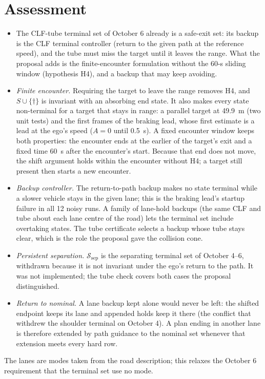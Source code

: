 \documentclass[11pt]{article}
\begin{document}
\section{Assessment}
\begin{itemize}
\item The CLF-tube terminal set of October 6 already is a safe-exit set: its
  backup is the CLF terminal controller (return to the given path at the
  reference speed), and the tube must miss the target until it leaves the
  range. What the proposal adds is the finite-encounter formulation without
  the 60-s sliding window (hypothesis H4), and a backup that may keep
  avoiding.
\item \emph{Finite encounter.} Requiring the target to leave the range
  removes H4, and $S\cup\{\dagger\}$ is invariant with an absorbing end state.
  It also makes every state non-terminal for a target that stays in range: a
  parallel target at 49.9~m (two unit tests) and the first frames of the
  braking lead, whose first estimate is a lead at the ego's speed ($A=0$ until
  0.5~s). A fixed encounter window keeps both properties: the encounter ends at
  the earlier of the target's exit and a fixed time 60~s after the encounter's
  start. Because that end does not move, the shift argument holds within the
  encounter without H4; a target still present then starts a new encounter.
\item \emph{Backup controller.} The return-to-path backup makes no state
  terminal while a slower vehicle stays in the given lane; this is the
  braking lead's startup failure in all 12 noisy runs. A family of lane-hold
  backups (the same CLF and tube about each lane centre of the road) lets the
  terminal set include overtaking states. The tube certificate selects a backup
  whose tube stays clear, which is the role the proposal gave the collision
  cone.
\item \emph{Persistent separation.} $\mathcal S_{\mathrm{sep}}$ is the
  separating terminal set of October 4--6, withdrawn because it is not
  invariant under the ego's return to the path. It was not implemented; the
  tube check covers both cases the proposal distinguished.
\item \emph{Return to nominal.} A lane backup kept alone would never be left:
  the shifted endpoint keeps its lane and appended holds keep it there (the
  conflict that withdrew the shoulder terminal on October 4). A plan ending
  in another lane is therefore extended by path guidance to the nominal set
  whenever that extension meets every hard row.
\end{itemize}
The lanes are modes taken from the road description; this relaxes the
October 6 requirement that the terminal set use no mode.
\end{document}
